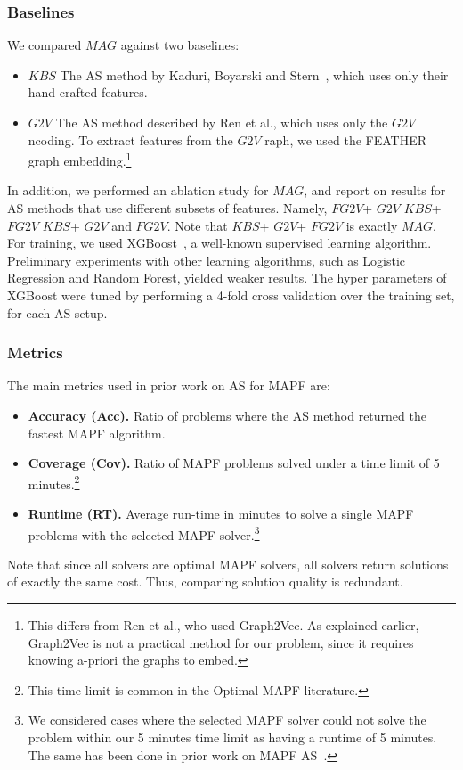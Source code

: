 \documentclass{ecai}
\newcommand{\gtv}[1]{\ensuremath{\textit{G2V}}\xspace}
\newcommand{\fgtv}[1]{\ensuremath{\textit{FG2V}}\xspace}
\newcommand{\kaduri}[1]{\ensuremath{\textit{KBS}}\xspace}
\newcommand{\mapfgas}[1]{\ensuremath{\textit{MAG}}\xspace}
\begin{document}
\subsubsection{Baselines}
We compared \mapfgas\ against two baselines: 
\begin{itemize}
    \item \textbf{\kaduri .} The AS method by Kaduri, Boyarski and Stern~\cite{kaduri2020algorithm}, which uses only their hand crafted features. 
    \item \textbf{\gtv.} The AS method described by Ren et al.\cite{ren2021mapfast}, which uses only the \gtv encoding. To extract features from the \gtv graph, we used the FEATHER graph embedding.\footnote{This differs from Ren et al., who used Graph2Vec. As explained earlier, Graph2Vec is not a practical method for our problem, since it requires knowing a-priori the graphs to embed.}
\end{itemize}
In addition, we performed an ablation study for \mapfgas\ , and report on results for AS methods that use different subsets of features. Namely, \fgtv\ + \gtv\, 
\kaduri\ + \fgtv\, 
\kaduri\ + \gtv\, 
and \fgtv\ .
Note that \kaduri\ + \gtv\ + \fgtv\ is exactly \mapfgas\ .
For training, we used XGBoost~\cite{chen2016xgboost}, a well-known supervised learning algorithm. 
Preliminary experiments with other learning algorithms, such as Logistic Regression and Random Forest, yielded weaker results. %
The hyper parameters of XGBoost were tuned by performing a  4-fold cross validation over the training set, for each AS setup. 


\subsubsection{Metrics}
The main metrics used in prior work on AS for MAPF are:
\begin{itemize}
    \item \textbf{Accuracy (Acc).} Ratio of problems where the AS method returned the fastest MAPF algorithm. 
    \item \textbf{Coverage (Cov).} Ratio of MAPF problems solved under a time limit of 5 minutes.\footnote{This time limit is common in the Optimal MAPF literature.}
    \item \textbf{Runtime (RT).} Average run-time in minutes to solve a single MAPF problems with the selected MAPF solver.\footnote{We considered cases where the selected MAPF solver could not solve the problem within our 5 minutes time limit as having a runtime of 5 minutes. The same has been done in prior work on MAPF AS~\cite{kaduri2020algorithm,ren2021mapfast}.}
\end{itemize}
Note that since all solvers are optimal MAPF solvers, all solvers return solutions of exactly the same cost. Thus, comparing solution quality is redundant. 
\end{document}
